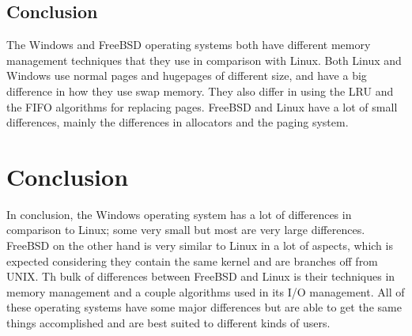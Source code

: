 \documentclass[draftclsnofoot, onecolumn, compsoc, 10pt]{IEEEtran}
\begin{document}
\subsection{Conclusion}
The Windows and FreeBSD operating systems both have different memory management techniques that they use in comparison with Linux. Both Linux and Windows use normal pages and hugepages of different size, and have a big difference in how they use swap memory. They also differ in using the LRU and the FIFO algorithms for replacing pages. FreeBSD and Linux have a lot of small differences, mainly the differences in allocators and the paging system.

\section{Conclusion}
In conclusion, the Windows operating system has a lot of differences in comparison to Linux; some very small but most are very large differences. FreeBSD on the other hand is very similar to Linux in a lot of aspects, which is expected considering they contain the same kernel and are branches off from UNIX. Th bulk of differences between FreeBSD and Linux is their techniques in memory management and a couple algorithms used in its I/O management. All of these operating systems have some major differences but are able to get the same things accomplished and are best suited to different kinds of users.

\newpage
\nocite{*}


\end{document}
